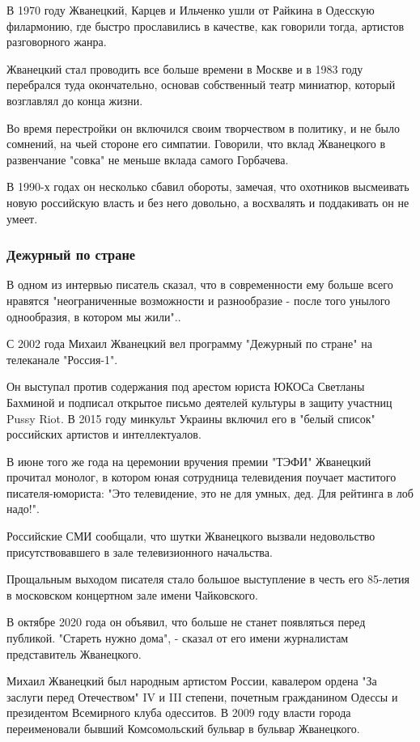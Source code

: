 В 1970 году Жванецкий, Карцев и Ильченко ушли от Райкина в Одесскую
филармонию, где быстро прославились в качестве, как говорили тогда,
артистов разговорного жанра.

Жванецкий стал проводить все больше времени в Москве и в 1983 году
перебрался туда окончательно, основав собственный театр миниатюр, который
возглавлял до конца жизни.

Во время перестройки он включился своим творчеством в политику, и не было
сомнений, на чьей стороне его симпатии. Говорили, что вклад Жванецкого в
развенчание "совка" не меньше вклада самого Горбачева.

В 1990-х годах он несколько сбавил обороты, замечая, что охотников
высмеивать новую российскую власть и без него довольно, а восхвалять и
поддакивать он не умеет.

\subsubsection{Дежурный по стране}

В одном из интервью писатель сказал, что в современности ему больше всего
нравятся "неограниченные возможности и разнообразие - после того унылого
однообразия, в котором мы жили"..

С 2002 года Михаил Жванецкий вел программу "Дежурный по стране" на
телеканале "Россия-1".

Он выступал против содержания под арестом юриста ЮКОСа Светланы Бахминой и
подписал открытое письмо деятелей культуры в защиту участниц Pussy Riot. В
2015 году минкульт Украины включил его в "белый список" российских
артистов и интеллектуалов.

В июне того же года на церемонии вручения премии "ТЭФИ" Жванецкий прочитал
монолог, в котором юная сотрудница телевидения поучает маститого
писателя-юмориста: "Это телевидение, это не для умных, дед. Для рейтинга в
лоб надо!".

Российские СМИ сообщали, что шутки Жванецкого вызвали недовольство
присутствовавшего в зале телевизионного начальства.

Прощальным выходом писателя стало большое выступление в честь его 85-летия
в московском концертном зале имени Чайковского.

В октябре 2020 года он объявил, что больше не станет появляться перед
публикой. "Стареть нужно дома", - сказал от его имени журналистам
представитель Жванецкого.

Михаил Жванецкий был народным артистом России, кавалером ордена "За
заслуги перед Отечеством" IV и III степени, почетным гражданином Одессы и
президентом Всемирного клуба одесситов. В 2009 году власти города
переименовали бывший Комсомольский бульвар в бульвар Жванецкого.

